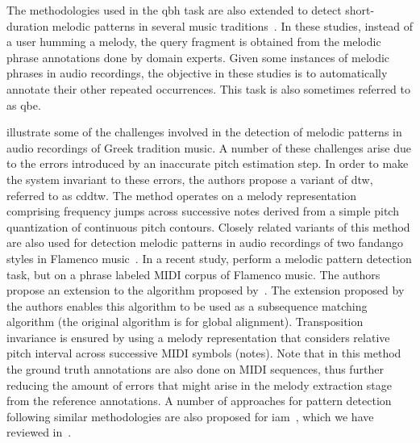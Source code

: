 The methodologies used in the \gls{qbh} task are also extended to detect short-duration melodic patterns in several music traditions~\citep{pikrakis2003recognition,pikrakis2012tracking,pikrakis2016detection,Ross2012b,dutta2014modified}. In these studies, instead of a user humming a melody, the query fragment is obtained from the melodic phrase annotations done by domain experts. Given some instances of melodic phrases in audio recordings, the objective in these studies is to automatically annotate their other repeated occurrences. This task is also sometimes referred to as \gls{qbe}. 

\cite{pikrakis2003recognition} illustrate some of the challenges involved in the detection of melodic patterns in audio recordings of Greek tradition music. A number of these challenges arise due to the errors introduced by an inaccurate pitch estimation step. In order to make the system invariant to these errors, the authors propose a variant of \gls{dtw}, referred to as \gls{cddtw}. The method operates on a melody representation comprising frequency jumps across successive notes derived from a simple pitch quantization of continuous pitch contours. Closely related variants of this method are also used for detection melodic patterns in audio recordings of two fandango styles in Flamenco music~\citep{pikrakis2012tracking,gomez2012automatic}. In a recent study, \cite{pikrakis2016detection} perform a melodic pattern detection task, but on a phrase labeled MIDI corpus of Flamenco music. The authors propose an extension to the algorithm proposed by~\cite{needleman1970general}. The extension proposed by the authors enables this algorithm to be used as a subsequence matching algorithm (the original algorithm is for global alignment). Transposition invariance is ensured by using a melody representation that considers relative pitch interval across successive MIDI symbols (notes). Note that in this method the ground truth annotations are also done on MIDI sequences, thus further reducing the amount of errors that might arise in the melody extraction stage from the reference annotations. A number of approaches for pattern detection following similar methodologies are also proposed for \gls{iam}~\citep{Ross2012b,dutta2014modified,ganguli2015efficient}, which we have reviewed in~. 

